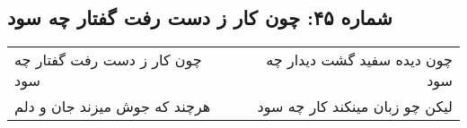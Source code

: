 \begin{center}
\section*{شماره ۴۵: چون کار ز دست رفت گفتار چه سود}
\label{sec:045}
\begin{longtable}{l p{0.5cm} r}
چون کار ز دست رفت گفتار چه سود
&&
چون دیده سفید گشت دیدار چه سود
\\
هرچند که جوش میزند جان و دلم
&&
لیکن چو زبان مینکند کار چه سود
\\
\end{longtable}
\end{center}
